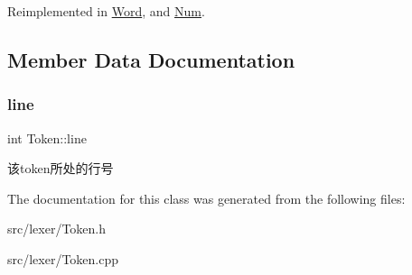 Reimplemented in \hyperlink{class_word_a950a81bfd0fc369b0eb8d0d6b27e2870}{Word}, and \hyperlink{class_num_aec8ab507b42f2080a8cc197f45f0c935}{Num}.



\subsection{Member Data Documentation}
\mbox{\label{class_token_a4b96c2a31d7c374fd2bd1986794f80dd}} 
\subsubsection{\texorpdfstring{line}{line}}
{\footnotesize\ttfamily int Token\+::line}

该token所处的行号 

The documentation for this class was generated from the following files\+:\begin{DoxyCompactItemize}
\item 
src/lexer/Token.\+h\item 
src/lexer/Token.\+cpp\end{DoxyCompactItemize}
